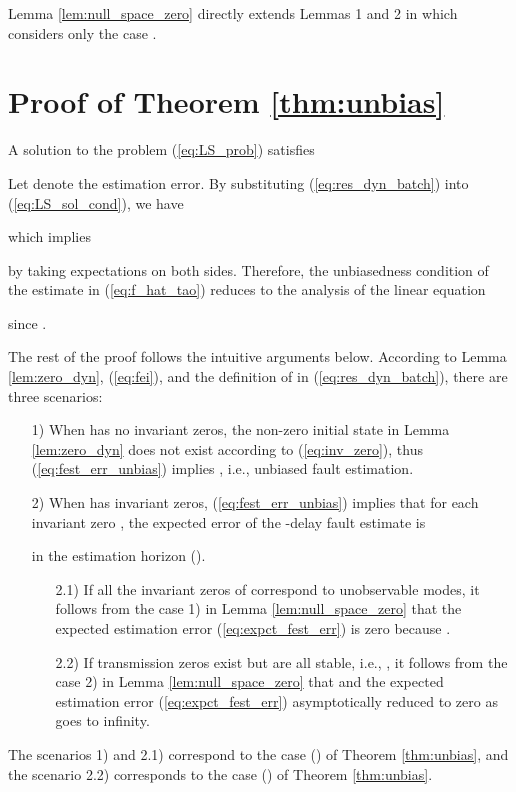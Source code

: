 \documentclass[twocolumn]{autart}
\begin{document}
Lemma \ref{lem:null_space_zero} directly extends Lemmas 1 and 2 in \cite{Wan2014} which considers only the case . 


\section{Proof of Theorem \ref{thm:unbias}}\label{app:thm_unbias}

A solution  to the problem (\ref{eq:LS_prob}) satisfies

Let  denote the estimation error.
By substituting (\ref{eq:res_dyn_batch}) into (\ref{eq:LS_sol_cond}), we have

which implies

by taking expectations on both sides. Therefore, the unbiasedness condition of the estimate in (\ref{eq:f_hat_tao}) reduces to the analysis of the linear equation 

since 
. 


The rest of the proof follows the intuitive arguments below.
According to Lemma \ref{lem:zero_dyn}, (\ref{eq:fei}), and the definition of  in (\ref{eq:res_dyn_batch}), there are three scenarios:
\begin{enumerate}
	\item[1)] When  has no invariant zeros, the non-zero initial state  in Lemma \ref{lem:zero_dyn} does not exist according to (\ref{eq:inv_zero}), thus (\ref{eq:fest_err_unbias}) implies , i.e., unbiased fault estimation.
	\item[2)] When  has invariant zeros, (\ref{eq:fest_err_unbias}) implies that for each invariant zero , the expected error of the -delay fault estimate  is 
	
	in the estimation horizon  ().
		\begin{enumerate}
			\item[2.1)] If all the invariant zeros of  correspond to unobservable modes, it follows from the case 1) in Lemma \ref{lem:null_space_zero} that the expected estimation error (\ref{eq:expct_fest_err}) is zero because .
			\item[2.2)] If transmission zeros exist but are all stable, i.e., , it follows from the case 2) in Lemma \ref{lem:null_space_zero} that  and the expected estimation error (\ref{eq:expct_fest_err}) asymptotically reduced to zero as  goes to infinity.
		\end{enumerate}
\end{enumerate}
The scenarios 1) and 2.1) correspond to the case () of Theorem \ref{thm:unbias}, and the scenario 2.2) corresponds to the case () of Theorem \ref{thm:unbias}.
\end{document}

